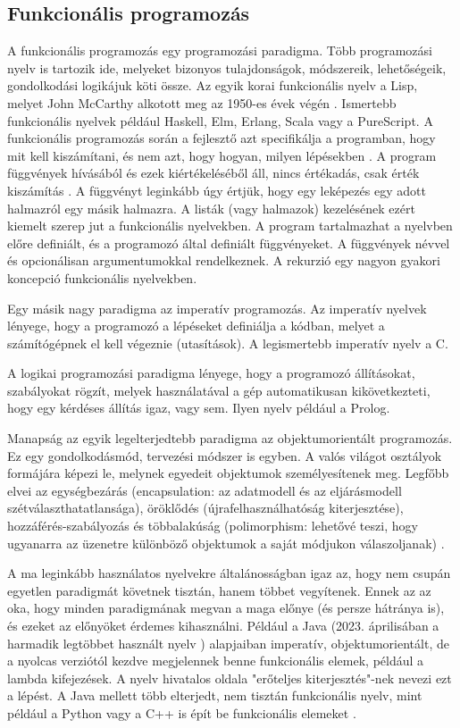 \documentclass[12pt]{article}
\begin{document}
\subsection{Funkcionális programozás}
A funkcionális programozás egy programozási paradigma. Több programozási nyelv is tartozik ide, melyeket bizonyos tulajdonságok, módszereik, lehetőségeik, gondolkodási logikájuk köti össze. Az egyik korai funkcionális nyelv a Lisp, melyet John McCarthy alkotott meg az 1950-es évek végén \cite{JM}. Ismertebb funkcionális nyelvek például Haskell, Elm, Erlang, Scala vagy a PureScript. 
A funkcionális programozás során a fejlesztő azt specifikálja a programban, hogy mit kell kiszámítani, és nem azt, hogy hogyan, milyen lépésekben \cite{VD}. A program függvények hívásából és ezek kiértékeléséből áll, nincs értékadás, csak érték kiszámítás \cite{VD}. A függvényt leginkább úgy értjük, hogy egy leképezés egy adott halmazról egy másik halmazra\cite{sy}. A listák (vagy halmazok) kezelésének ezért kiemelt szerep jut a funkcionális nyelvekben. A program tartalmazhat a nyelvben előre definiált, és a programozó által definiált függvényeket. A függvények névvel és opcionálisan argumentumokkal rendelkeznek. A rekurzió egy nagyon gyakori koncepció funkcionális nyelvekben.

Egy másik nagy paradigma az imperatív programozás. Az imperatív nyelvek lényege, hogy a programozó a lépéseket definiálja a kódban, melyet a számítógépnek el kell végeznie (utasítások). A legismertebb imperatív nyelv a C.

A logikai programozási paradigma lényege, hogy a programozó állításokat, szabályokat rögzít, melyek használatával a gép automatikusan kikövetkezteti, hogy egy kérdéses állítás igaz, vagy sem. Ilyen nyelv például a Prolog.

Manapság az egyik legelterjedtebb paradigma az objektumorientált programozás. Ez egy gondolkodásmód, tervezési módszer is egyben. A valós világot osztályok formájára képezi le, melynek egyedeit objektumok személyesítenek meg. Legfőbb elvei az egységbezárás (encapsulation: az adatmodell és az eljárásmodell szétválaszthatatlansága), öröklődés (újrafelhasználhatóság kiterjesztése), hozzáférés-szabályozás és többalakúság (polimorphism: lehetővé teszi, hogy ugyanarra az üzenetre különböző objektumok a saját módjukon válaszoljanak) \cite{VD}.

A ma leginkább használatos nyelvekre általánosságban igaz az, hogy nem csupán egyetlen paradigmát követnek tisztán, hanem többet vegyítenek. Ennek az az oka, hogy minden paradigmának megvan a maga előnye (és persze hátránya is), és ezeket az előnyöket érdemes kihasználni. Például a Java (2023. áprilisában a harmadik legtöbbet használt nyelv \cite{TIO}) alapjaiban imperatív, objektumorientált, de a nyolcas verziótól kezdve \cite{Java} megjelennek benne funkcionális elemek, például a lambda kifejezések. A nyelv hivatalos oldala \cite{Java} "erőteljes kiterjesztés"-nek nevezi ezt a lépést.
A Java mellett több elterjedt, nem tisztán funkcionális nyelv, mint például a Python vagy a C++ is épít be funkcionális elemeket \cite{py} \cite{cpp}.
\end{document}
